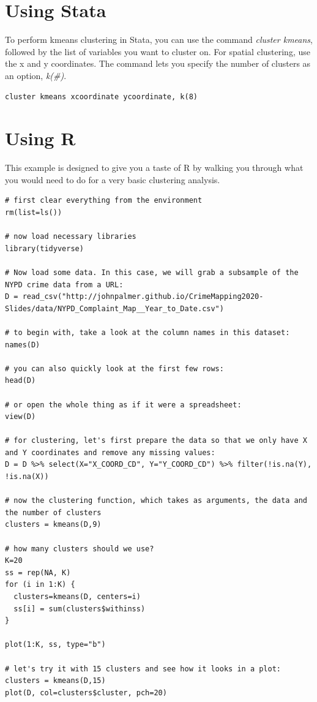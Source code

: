 \documentclass[]{book}
\begin{document}
\hypertarget{using-stata}{%
\section{Using Stata}\label{using-stata}}

To perform kmeans clustering in Stata, you can use the command \emph{cluster kmeans}, followed by the list of variables you want to cluster on. For spatial clustering, use the x and y coordinates. The command lets you specify the number of clusters as an option, \emph{k(\#)}.

\begin{verbatim}
cluster kmeans xcoordinate ycoordinate, k(8)
\end{verbatim}

\hypertarget{using-r}{%
\section{Using R}\label{using-r}}

This example is designed to give you a taste of R by walking you through what you would need to do for a very basic clustering analysis.

\begin{verbatim}
# first clear everything from the environment
rm(list=ls())

# now load necessary libraries
library(tidyverse)

# Now load some data. In this case, we will grab a subsample of the NYPD crime data from a URL:
D = read_csv("http://johnpalmer.github.io/CrimeMapping2020-Slides/data/NYPD_Complaint_Map__Year_to_Date.csv")

# to begin with, take a look at the column names in this dataset:
names(D)

# you can also quickly look at the first few rows:
head(D)

# or open the whole thing as if it were a spreadsheet:
view(D)

# for clustering, let's first prepare the data so that we only have X and Y coordinates and remove any missing values:
D = D %>% select(X="X_COORD_CD", Y="Y_COORD_CD") %>% filter(!is.na(Y), !is.na(X))

# now the clustering function, which takes as arguments, the data and the number of clusters
clusters = kmeans(D,9)

# how many clusters should we use?
K=20
ss = rep(NA, K)
for (i in 1:K) {
  clusters=kmeans(D, centers=i)
  ss[i] = sum(clusters$withinss)
}

plot(1:K, ss, type="b")

# let's try it with 15 clusters and see how it looks in a plot:
clusters = kmeans(D,15)
plot(D, col=clusters$cluster, pch=20)
\end{verbatim}
\end{document}
